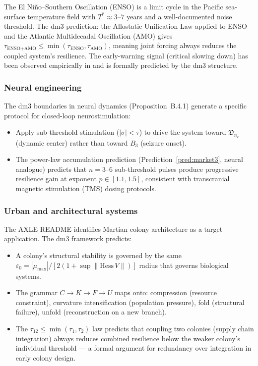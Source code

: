 The El Ni\~{n}o--Southern Oscillation (ENSO) is a limit cycle
in the Pacific sea-surface temperature field with $T^* \approx
3$--$7$ years and a well-documented noise threshold. The dm3
prediction: the Allostatic Unification Law applied to ENSO
and the Atlantic Multidecadal Oscillation (AMO) gives
$\tau_{\text{ENSO+AMO}} \le \min(\tau_{\text{ENSO}}, \tau_{\text{AMO}})$,
meaning joint forcing always reduces the coupled system's
resilience. The early-warning signal (critical slowing down)
has been observed empirically in \cite{Lenton2011} and is
formally predicted by the dm3 structure.

\subsubsection{Neural engineering}

The dm3 boundaries in neural dynamics (Proposition~B.4.1)
generate a specific protocol for closed-loop neurostimulation:
\begin{itemize}
  \item Apply sub-threshold stimulation ($|\sigma| < \tau$)
    to drive the system toward $\mathfrak{D}_{n_c}$ (dynamic
    center) rather than toward $B_3$ (seizure onset).
  \item The power-law accumulation prediction (Prediction~\ref{pred:market3},
    neural analogue) predicts that $n = 3$--$6$ sub-threshold
    pulses produce progressive resilience gain at exponent
    $p \in [1.1, 1.5]$, consistent with transcranial magnetic
    stimulation (TMS) dosing protocols.
\end{itemize}

\subsubsection{Urban and architectural systems}

The AXLE README identifies Martian colony architecture as a
target application. The dm3 framework predicts:
\begin{itemize}
  \item A colony's structural stability is governed by the
    same $\varepsilon_0 = |\mu_{\max}| /
    [2(1 + \sup \|\mathrm{Hess}\,V\|)]$ radius that governs
    biological systems.
  \item The grammar $C \to K \to F \to U$ maps onto:
    compression (resource constraint), curvature intensification
    (population pressure), fold (structural failure), unfold
    (reconstruction on a new branch).
  \item The $\tau_{12} \le \min(\tau_1, \tau_2)$ law predicts
    that coupling two colonies (supply chain integration)
    always reduces combined resilience below the weaker colony's
    individual threshold --- a formal argument for redundancy
    over integration in early colony design.
\end{itemize}

